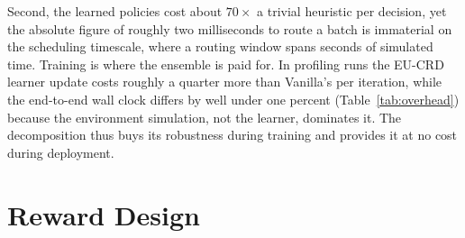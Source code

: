 Second, the learned policies cost about $70\times$ a trivial heuristic per decision, yet the absolute figure of roughly two milliseconds to route a batch is immaterial on the scheduling timescale, where a routing window spans seconds of simulated time. Training is where the ensemble is paid for. In profiling runs the EU-CRD learner update costs roughly a quarter more than Vanilla's per iteration, while the end-to-end wall clock differs by well under one percent (Table~\ref{tab:overhead}) because the environment simulation, not the learner, dominates it. The decomposition thus buys its robustness during training and provides it at no cost during deployment.

\section{Reward Design}
\label{app:reward}

